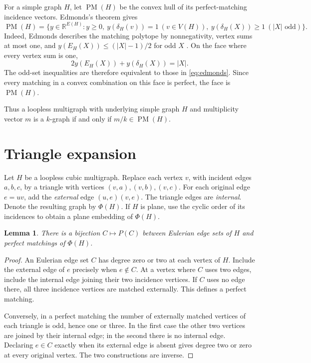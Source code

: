 \documentclass[10pt]{article}
\newtheorem{lemma}[theorem]{Lemma}
\theoremstyle{definition}
\theoremstyle{remark}
\DeclareMathOperator{\PM}{PM}
\newcommand{\RR}{\mathbb R}
\begin{document}
For a simple graph $H$, let $\PM(H)$ be the convex hull of its perfect-matching incidence vectors.
Edmonds's theorem gives
\begin{equation}\label{eq:edmonds}
 \PM(H)=\{y\in\RR^{E(H)}:y\geq0,\ y(\delta_H(v))=1\ (v\in V(H)),\
 y(\delta_H(X))\geq1\ (|X|\text{ odd})\}.
\end{equation}
Indeed, Edmonds describes the matching polytope by nonnegativity, vertex sums at most one, and $y(E_H(X))\leq(|X|-1)/2$ for odd $X$ \cite[Section~2, Theorem~(P), pp.~125--126]{Edmonds}.
On the face where every vertex sum is one,
\[
 2y(E_H(X))+y(\delta_H(X))=|X|.
\]
The odd-set inequalities are therefore equivalent to those in \eqref{eq:edmonds}.
Since every matching in a convex combination on this face is perfect, the face is $\PM(H)$.

Thus a loopless multigraph with underlying simple graph $H$ and multiplicity vector $m$ is a $k$-graph if and only if $m/k\in\PM(H)$.

\section{Triangle expansion}\label{sec:gadget}
Let $H$ be a loopless cubic multigraph.
Replace each vertex $v$, with incident edges $a,b,c$, by a triangle with vertices $(v,a),(v,b),(v,c)$.
For each original edge $e=uv$, add the \emph{external} edge $(u,e)(v,e)$.
The triangle edges are \emph{internal}.
Denote the resulting graph by $\Phi(H)$.
If $H$ is plane, use the cyclic order of its incidences to obtain a plane embedding of $\Phi(H)$.

\begin{lemma}\label{lem:bijection}
There is a bijection $C\mapsto P(C)$ between Eulerian edge sets of $H$ and perfect matchings of $\Phi(H)$.
\end{lemma}
\begin{proof}
An Eulerian edge set $C$ has degree zero or two at each vertex of $H$.
Include the external edge of $e$ precisely when $e\notin C$.
At a vertex where $C$ uses two edges, include the internal edge joining their two incidence vertices.
If $C$ uses no edge there, all three incidence vertices are matched externally.
This defines a perfect matching.

Conversely, in a perfect matching the number of externally matched vertices of each triangle is odd, hence one or three.
In the first case the other two vertices are joined by their internal edge; in the second there is no internal edge.
Declaring $e\in C$ exactly when its external edge is absent gives degree two or zero at every original vertex.
The two constructions are inverse.
\end{proof}
\end{document}
